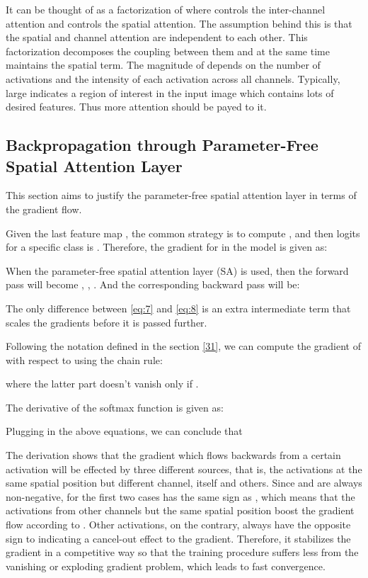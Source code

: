 \documentclass[10pt,twocolumn,letterpaper]{article}
\begin{document}
It can be thought of as a factorization of  where  controls the inter-channel attention and  controls the spatial attention. The assumption behind this is that the spatial and channel attention are independent to each other. This factorization decomposes the coupling between them and at the same time maintains the spatial term. The magnitude of  depends on the number of activations and the intensity of each activation across all channels. Typically, large  indicates a region of interest in the input image which contains lots of desired features. Thus more attention should be payed to it.








\subsection{Backpropagation through Parameter-Free Spatial Attention Layer} \label{BPSA}

This section aims to justify  the parameter-free spatial attention layer in terms of the gradient flow.

Given the last feature map , the common strategy is to compute , and then logits for a specific class is . Therefore, the gradient for  in the model is given as:

When the parameter-free spatial attention layer (SA) is used, then the forward pass will become , , . And the corresponding backward pass will be:

The only difference between \eqref{eq:7} and \eqref{eq:8} is an extra intermediate term  that scales the gradients before it is passed further.

Following the notation defined in the section \ref{31}, we can compute the gradient of  with respect to  using the chain rule:

where the latter part doesn't vanish only if .

The derivative of the softmax function is given as:

Plugging in the above equations, we can conclude that



The derivation shows that the gradient which flows backwards from a certain activation  will be effected by three different sources, that is, the activations at the same spatial position but different channel, itself and others. Since  and  are always non-negative,  for the first two cases has the same sign as , which means that the activations from other channels but the same spatial position boost the gradient flow according to . Other activations, on the contrary, always have the opposite sign to  indicating a cancel-out effect to the gradient. Therefore, it stabilizes the gradient in a competitive way so that the training procedure suffers less from the vanishing or exploding gradient problem, which leads to fast convergence.
\end{document}
